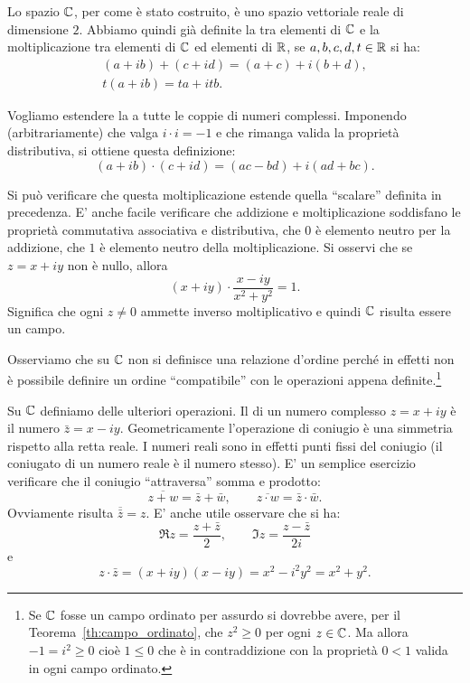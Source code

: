 Lo spazio $\mathbb C$, per come
è stato costruito, è uno spazio vettoriale reale di dimensione $2$.
Abbiamo quindi già definite la 
tra elementi di $\mathbb C$ e la moltiplicazione
tra elementi di $\mathbb C$ ed elementi di $\mathbb R$,
se $a,b,c,d,t\in \mathbb R$ si ha:
\begin{gather*}
 (a+ib) + (c+id) = (a+c) + i (b+d), \\
 t(a+ib) = ta + itb.
\end{gather*}

Vogliamo estendere la  a tutte le coppie di numeri complessi.
Imponendo (arbitrariamente) che valga $i\cdot i = -1$ e che rimanga
valida la proprietà distributiva, si ottiene
questa definizione:
\[
   (a+ib) \cdot (c+id) = (ac-bd) + i(ad+bc).
\]

Si può verificare che questa moltiplicazione estende quella ``scalare'' definita
in precedenza.
E' anche facile verificare che addizione e moltiplicazione soddisfano
le proprietà commutativa associativa e distributiva,
che $0$ è elemento neutro per la addizione, che $1$ è elemento neutro
della moltiplicazione.
Si osservi che se $z=x+iy$ non è nullo, allora
\[
  (x+iy) \cdot \frac{x-iy}{x^2+y^2} = 1.
\]
Significa che ogni $z\neq 0$ ammette inverso moltiplicativo e quindi $\mathbb C$
risulta essere un campo.

Osserviamo che su $\mathbb C$ non si definisce una relazione d'ordine perché
in effetti non è possibile definire un ordine ``compatibile'' con le operazioni
appena definite.\footnote{%
Se $\mathbb C$ fosse un campo ordinato per assurdo
si dovrebbe avere,
per il Teorema~\ref{th:campo_ordinato},
che $z^2\ge 0$ per ogni $z\in \mathbb C$. Ma
allora $-1 =i^2 \ge 0$ cioè $1\le 0$ che è in contraddizione
con la proprietà $0<1$ valida in ogni
campo ordinato.
}

Su $\mathbb C$ definiamo delle ulteriori operazioni.
Il 
di un numero complesso $z=x+iy$ è il numero
$\bar z = x - iy$. Geometricamente l'operazione di coniugio è una simmetria
rispetto alla retta reale. I numeri reali sono in effetti punti fissi del
coniugio (il coniugato di un numero reale è il numero stesso).
E' un semplice esercizio verificare che il coniugio ``attraversa''
somma e prodotto:
\[
\overline{z+w} = \bar z + \bar w, \qquad
\overline{z\cdot w} = \bar z \cdot \bar w.
\]
Ovviamente risulta $\overline {\bar z} = z$.
E' anche utile osservare che si ha:
\begin{equation}\label{eq:re_im}
  \Re z = \frac{z+\bar z}{2}, \qquad
  \Im z = \frac{z-\bar z}{2i}
\end{equation}
e
\[
z \cdot \bar z = (x+iy)(x-iy) = x^2-i^2y^2 = x^2+y^2.
\]

